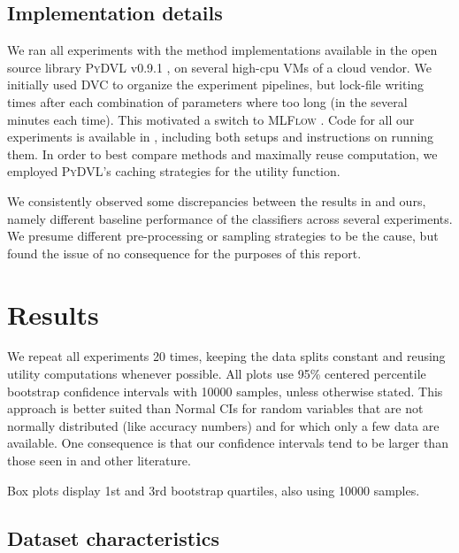 \documentclass[10pt]{article}
\newcommand{\tmname}[1]{\textsc{#1}}
\begin{document}
\subsection{Implementation details}

We ran all experiments with the method implementations available in the open
source library {\tmname{PyDVL}} v0.9.1 {\citep{transferlab_pydvl_2022}}, on
several high-cpu VMs of a cloud vendor. We initially used {\tmname{DVC}} to
organize the experiment pipelines, but lock-file writing times after each
combination of parameters where too long (in the several minutes each time).
This motivated a switch to {\tmname{MLFlow}} {\citep{wilson_mlflow_2023}}.
Code for all our experiments is available in {\citep{semmler_re_2024}}, including both setups
and instructions on running them. In order to best compare methods and
maximally reuse computation, we employed {\tmname{PyDVL}}'s caching strategies
for the utility function.

We consistently observed some discrepancies between the results in
{\cite{schoch_csshapley_2022}} and ours, namely different baseline
performance of the classifiers across several experiments. We presume
different pre-processing or sampling strategies to be the cause, but found the
issue of no consequence for the purposes of this report.

\section{Results}\label{sec:results}

We repeat all experiments 20 times, keeping the data splits constant and
reusing utility computations whenever possible. All plots use 95\% centered
percentile bootstrap confidence intervals with 10000 samples, unless otherwise
stated. This approach is better suited than Normal CIs for random variables
that are not normally distributed (like accuracy numbers) and for which only a
few data are available. One consequence is that our confidence intervals tend
to be larger than those seen in {\cite{schoch_csshapley_2022}} and other
literature.

Box plots display 1st and 3rd bootstrap quartiles, also using 10000 samples.

\subsection{Dataset characteristics}\label{sec:dataset-characteristics}
\end{document}
